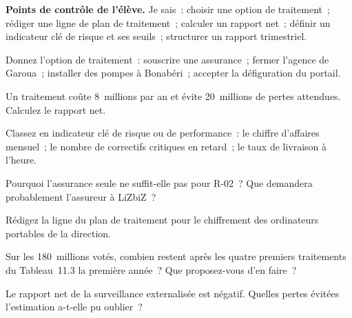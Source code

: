 \begin{boxinfo}
\textbf{Points de contrôle de l'élève.} Je sais~: choisir une option de
traitement~; rédiger une ligne de plan de traitement~; calculer un rapport
net~; définir un indicateur clé de risque et ses seuils~; structurer un
rapport trimestriel.
\end{boxinfo}

\bigskip

\begin{boxexo}[title={\ding{45}\quad Exercice~11.1. Quelle option~? \niveaubase}]
Donnez l'option de traitement~: souscrire une assurance~; fermer l'agence
de Garoua~; installer des pompes à Bonabéri~; accepter la défiguration du
portail.
\end{boxexo}

\begin{boxexo}[title={\ding{45}\quad Exercice~11.2. Rapport net \niveaubase}]
Un traitement coûte 8~millions par an et évite 20~millions de pertes
attendues. Calculez le rapport net.
\end{boxexo}

\begin{boxexo}[title={\ding{45}\quad Exercice~11.3. KRI ou KPI \niveaubase}]
Classez en indicateur clé de risque ou de performance~: le chiffre
d'affaires mensuel~; le nombre de correctifs critiques en retard~; le taux
de livraison à l'heure.
\end{boxexo}

\begin{boxexo}[title={\ding{45}\quad Exercice~11.4. L'assurance \niveaumoyen}]
Pourquoi l'assurance seule ne suffit-elle pas pour R-02~? Que demandera
probablement l'assureur à LiZbiZ~?
\end{boxexo}

\begin{boxexo}[title={\ding{45}\quad Exercice~11.5. Une ligne de plan \niveaumoyen}]
Rédigez la ligne du plan de traitement pour le chiffrement des
ordinateurs portables de la direction.
\end{boxexo}

\begin{boxexo}[title={\ding{45}\quad Exercice~11.6. Le budget \niveaumoyen}]
Sur les 180~millions votés, combien restent après les quatre premiers
traitements du Tableau~11.3 la première année~? Que proposez-vous d'en
faire~?
\end{boxexo}

\begin{boxexo}[title={\ding{45}\quad Exercice~11.7. Le SOC \niveaumoyen}]
Le rapport net de la surveillance externalisée est négatif. Quelles
pertes évitées l'estimation a-t-elle pu oublier~?
\end{boxexo}

